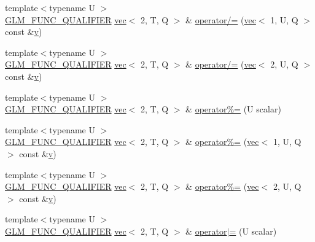 \begin{DoxyCompactItemize}
\item 
{\footnotesize template$<$typename U $>$ }\\\hyperlink{setup_8hpp_a33fdea6f91c5f834105f7415e2a64407}{G\+L\+M\+\_\+\+F\+U\+N\+C\+\_\+\+Q\+U\+A\+L\+I\+F\+I\+ER} \hyperlink{structglm_1_1vec}{vec}$<$ 2, T, Q $>$ \& \hyperlink{structglm_1_1vec_3_012_00_01_t_00_01_q_01_4_a686a525ae543252f200caac18da57c58}{operator/=} (\hyperlink{structglm_1_1vec}{vec}$<$ 1, U, Q $>$ const \&\hyperlink{_s_d_l__opengl_8h_a10a82eabcb59d2fcd74acee063775f90}{v})
\item 
{\footnotesize template$<$typename U $>$ }\\\hyperlink{setup_8hpp_a33fdea6f91c5f834105f7415e2a64407}{G\+L\+M\+\_\+\+F\+U\+N\+C\+\_\+\+Q\+U\+A\+L\+I\+F\+I\+ER} \hyperlink{structglm_1_1vec}{vec}$<$ 2, T, Q $>$ \& \hyperlink{structglm_1_1vec_3_012_00_01_t_00_01_q_01_4_aad3c8d0a01f1f7b325d450ecd7641e55}{operator/=} (\hyperlink{structglm_1_1vec}{vec}$<$ 2, U, Q $>$ const \&\hyperlink{_s_d_l__opengl_8h_a10a82eabcb59d2fcd74acee063775f90}{v})
\item 
{\footnotesize template$<$typename U $>$ }\\\hyperlink{setup_8hpp_a33fdea6f91c5f834105f7415e2a64407}{G\+L\+M\+\_\+\+F\+U\+N\+C\+\_\+\+Q\+U\+A\+L\+I\+F\+I\+ER} \hyperlink{structglm_1_1vec}{vec}$<$ 2, T, Q $>$ \& \hyperlink{structglm_1_1vec_3_012_00_01_t_00_01_q_01_4_a48f3476d27c4527802ddd58aa7762f64}{operator\%=} (U scalar)
\item 
{\footnotesize template$<$typename U $>$ }\\\hyperlink{setup_8hpp_a33fdea6f91c5f834105f7415e2a64407}{G\+L\+M\+\_\+\+F\+U\+N\+C\+\_\+\+Q\+U\+A\+L\+I\+F\+I\+ER} \hyperlink{structglm_1_1vec}{vec}$<$ 2, T, Q $>$ \& \hyperlink{structglm_1_1vec_3_012_00_01_t_00_01_q_01_4_a267102cc597898b31585143684c70530}{operator\%=} (\hyperlink{structglm_1_1vec}{vec}$<$ 1, U, Q $>$ const \&\hyperlink{_s_d_l__opengl_8h_a10a82eabcb59d2fcd74acee063775f90}{v})
\item 
{\footnotesize template$<$typename U $>$ }\\\hyperlink{setup_8hpp_a33fdea6f91c5f834105f7415e2a64407}{G\+L\+M\+\_\+\+F\+U\+N\+C\+\_\+\+Q\+U\+A\+L\+I\+F\+I\+ER} \hyperlink{structglm_1_1vec}{vec}$<$ 2, T, Q $>$ \& \hyperlink{structglm_1_1vec_3_012_00_01_t_00_01_q_01_4_a28092b816bf44c13025e22c1cdf53d68}{operator\%=} (\hyperlink{structglm_1_1vec}{vec}$<$ 2, U, Q $>$ const \&\hyperlink{_s_d_l__opengl_8h_a10a82eabcb59d2fcd74acee063775f90}{v})
\item 
{\footnotesize template$<$typename U $>$ }\\\hyperlink{setup_8hpp_a33fdea6f91c5f834105f7415e2a64407}{G\+L\+M\+\_\+\+F\+U\+N\+C\+\_\+\+Q\+U\+A\+L\+I\+F\+I\+ER} \hyperlink{structglm_1_1vec}{vec}$<$ 2, T, Q $>$ \& \hyperlink{structglm_1_1vec_3_012_00_01_t_00_01_q_01_4_acc0ff197f7484a80cfb27a71365d9756}{operator$\vert$=} (U scalar)

\end{DoxyCompactItemize}
